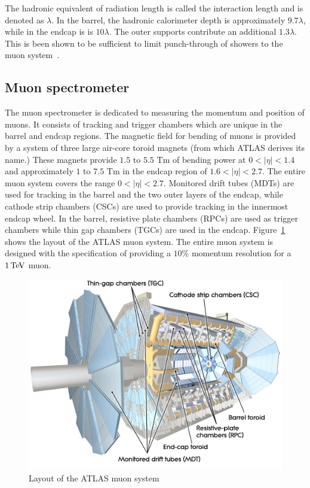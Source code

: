 The hadronic equivalent of radiation length is called the interaction length and is denoted as $\lambda$. In the barrel, the hadronic calorimeter depth is approximately $9.7\lambda$, while in the endcap is is $10\lambda$. The outer supports contribute an additional $1.3\lambda$. This is been shown to be sufficient to limit punch-through of showers to the muon system~\cite{ATLASPaper}.

\subsection{Muon spectrometer}

The muon spectrometer is dedicated to measuring the momentum and position of muons. It consists of tracking and trigger chambers which are unique in the barrel and endcap regions. The magnetic field for bending of muons is provided by a system of three large air-core toroid magnets (from which ATLAS derives its name.) These magnets provide $1.5$ to $5.5 \textrm{ Tm}$ of bending power at $0<|\eta|<1.4$ and approximately $1$ to $7.5 \textrm{ Tm}$ in the endcap region of $1.6 < |\eta| < 2.7$. The entire muon system covers the range $0 < |\eta|< 2.7$. Monitored drift tubes (MDTs) are used for tracking in the barrel and the two outer layers of the endcap, while cathode strip chambers (CSCs) are used to provide tracking in the innermost endcap wheel. In the barrel, resistive plate chambers (RPCs) are used as trigger chambers while thin gap chambers (TGCs) are used in the endcap. Figure~\ref{fig:ATLAS_muon} shows the layout of the ATLAS muon system. The entire muon system is designed with the specification of providing a $10\%$ momentum resolution for a $1 \TeV$ muon. 


\begin{figure}[h!]
  \centering
  \captionsetup{justification=centering}

  \includegraphics[width=\textwidth]{figures/ATLAS_muon}
   \caption{Layout of the ATLAS muon system~\cite{ATLASPaper}}
  \label{fig:ATLAS_muon}
\end{figure}


